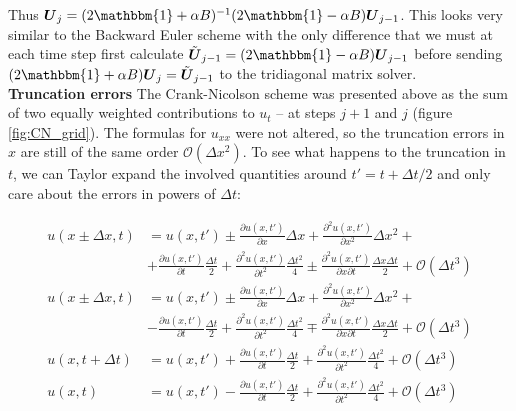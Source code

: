 \documentclass[a4paper, 11pt, notitlepage,english]{article}
\newcommand{\id}{\mathbbm{1}}
\begin{document}
Thus $\boldsymbol{U}_j = (2\id+\alpha B)^{-1}(2\id - \alpha B)\boldsymbol{U}_{j-1}$. This looks very similar to the Backward Euler scheme with the only difference that we must at each time step first calculate $\tilde{\boldsymbol{U}}_{j-1} = (2\id - \alpha B)\boldsymbol{U}_{j-1}$ before sending $(2\id + \alpha B)\boldsymbol{U}_j = \tilde{\boldsymbol{U}}_{j-1}$ to the tridiagonal matrix solver. \\

\textbf{Truncation errors} \newline
The Crank-Nicolson scheme was presented above as the sum of two equally weighted contributions to $u_t$ – at steps $j+1$ and $j$ (figure \ref{fig:CN_grid}). The formulas for $u_{xx}$ were not altered, so the truncation errors in $x$ are still of the same order $\mathcal{O}(\Delta x^2)$. To see what happens to the truncation in $t$, we can Taylor expand the involved quantities around $t' = t + \Delta t /2$ and only care about the errors in powers of $\Delta t$:

\begin{align}
u(x\pm\Delta x,t) &= u(x,t') \pm \frac{\partial u(x,t')}{\partial x}\Delta x + \frac{\partial^2 u(x,t')}{\partial x^2}\Delta x^2 + \\
&+ \frac{\partial u(x,t')}{\partial t}\frac{\Delta t}{2} + \frac{\partial^2 u(x,t')}{\partial t^2}\frac{\Delta t^2}{4} \pm \frac{\partial^2 u(x,t')}{\partial x \partial t}\frac{\Delta x \Delta t}{2} + \mathcal{O}(\Delta t^3)
\label{eq:Crank_Nicolson_expansions1} \\
u(x\pm\Delta x,t) &= u(x,t') \pm \frac{\partial u(x,t')}{\partial x}\Delta x + \frac{\partial^2 u(x,t')}{\partial x^2}\Delta x^2 + \\
&- \frac{\partial u(x,t')}{\partial t}\frac{\Delta t}{2} + \frac{\partial^2 u(x,t')}{\partial t^2}\frac{\Delta t^2}{4} \mp \frac{\partial^2 u(x,t')}{\partial x \partial t}\frac{\Delta x \Delta t}{2} + \mathcal{O}(\Delta t^3)
\label{eq:Crank_Nicolson_expansion2} \\
u(x,t+\Delta t) &= u(x,t') + \frac{\partial u(x,t')}{\partial t}\frac{\Delta t}{2} + \frac{\partial^2 u(x,t')}{\partial t^2}\frac{\Delta t^2}{4}  + \mathcal{O}(\Delta t^3)
\label{eq:Crank_Nicolson_expansion3} \\
u(x,t) &= u(x,t') - \frac{\partial u(x,t')}{\partial t}\frac{\Delta t}{2} + \frac{\partial^2 u(x,t')}{\partial t^2}\frac{\Delta t^2}{4}  + \mathcal{O}(\Delta t^3)
\label{eq:Crank_Nicolson_expansion4}
\end{align}
\end{document}
